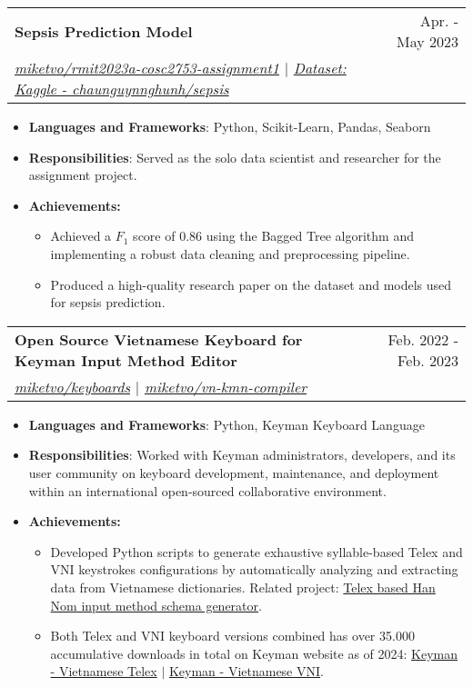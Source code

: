\documentclass[a4paper,11pt]{article}
\makeatletter
\newcommand{\resumeItemHeading}[1]{\item\small{\textbf{#1:}}\vspace{-1.6pt}}
\newcommand{\resumeItemPlain}[1]{
  \setstretch{0.96}
  \item\small{
    {#1 \vspace{-1pt}}
  }
  \setstretch{1.0}
}
\newcommand{\resumeItem}[2]{
  \item\small{
    \textbf{#1}{: #2 \vspace{-2pt}}
  }
}
\newcommand{\resumeSubheading}[4]{
  \vspace{-2pt}\item
    \begin{tabular*}{0.97\textwidth}{l@{\extracolsep{\fill}}r}
      \textbf{#1} & #2 \\
      \textit{\small#3} & \textit{\small #4} \\
    \end{tabular*}\vspace{-5pt}
}
\newcommand{\resumeItemListStart}{\begin{itemize}[leftmargin=16pt]}
\newcommand{\resumeItemListEnd}{\end{itemize}\vspace{-2pt}}
\newcommand{\resumeSubItemListStart}{\begin{itemize}[leftmargin=*]}
\newcommand{\resumeSubItemListEnd}{\end{itemize}\vspace{-2pt}}
\makeatother
\begin{document}
    \resumeSubheading
      {Sepsis Prediction Model}{Apr. - May 2023}
      {\href{https://github.com/miketvo/rmit2023a-cosc2753-assignment1}{\faGithub\space miketvo/rmit2023a-cosc2753-assignment1} $|$ \href{https://www.kaggle.com/datasets/chaunguynnghunh/sepsis/}{\faDatabase\space Dataset: Kaggle - chaunguynnghunh/sepsis}}{}
      \resumeItemListStart
        \resumeItem{Languages and Frameworks}
          {Python, Scikit-Learn, Pandas, Seaborn}
        \resumeItem{Responsibilities}
          {Served as the solo data scientist and researcher for the assignment project.}
        \resumeItemHeading{Achievements}
          \resumeSubItemListStart
            \resumeItemPlain
              {Achieved a $F_1$ score of 0.86 using the Bagged Tree algorithm and implementing a robust data cleaning and preprocessing pipeline.}
            \resumeItemPlain
              {Produced a high-quality research paper on the dataset and models used for sepsis prediction.}
          \resumeSubItemListEnd
      \resumeItemListEnd
  
      \resumeSubheading
        {Open Source Vietnamese Keyboard for Keyman Input Method Editor}{Feb. 2022 - Feb. 2023}
        {\href{https://github.com/miketvo/keyboards}{\faGithub\space miketvo/keyboards} $|$ \href{https://github.com/miketvo/vn-kmn-compiler}{\faGithub\space miketvo/vn-kmn-compiler}}{}
        \resumeItemListStart
          \resumeItem{Languages and Frameworks}
            {Python, Keyman Keyboard Language}
          \resumeItem{Responsibilities}
            {Worked with Keyman administrators, developers, and its user community on keyboard development, maintenance, and deployment within an international open-sourced collaborative environment.}
          \resumeItemHeading{Achievements}
            \resumeSubItemListStart
              \resumeItemPlain
                {Developed Python scripts to generate exhaustive syllable-based Telex and VNI keystrokes configurations by automatically analyzing and extracting data from Vietnamese dictionaries. Related project: \href{https://github.com/miketvo/rime-ime-han-nom-data}{\faGithub\space Telex based Han Nom input method schema generator}.}
              \resumeItemPlain
                {Both Telex and VNI keyboard versions combined has over 35.000 accumulative downloads in total on Keyman website as of 2024: \href{https://keyman.com/keyboards/vietnamese_telex}{\faGlobe\space Keyman - Vietnamese Telex} $|$ \href{https://keyman.com/keyboards/vietnamese_vni}{\faGlobe\space Keyman - Vietnamese VNI}.}
            \resumeSubItemListEnd
      \resumeItemListEnd
\end{document}
